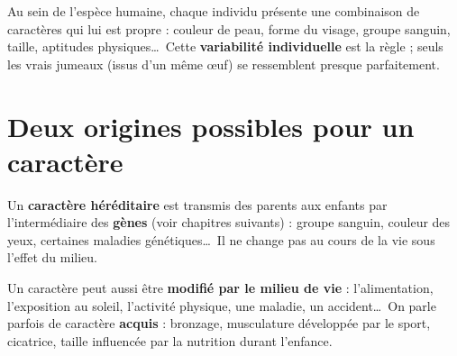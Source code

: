 \begin{propriete}
Au sein de l'espèce humaine, chaque individu présente une combinaison de caractères qui
lui est propre : couleur de peau, forme du visage, groupe sanguin, taille, aptitudes
physiques\dots\ Cette \textbf{variabilité individuelle} est la règle ; seuls les vrais
jumeaux (issus d'un même \oe uf) se ressemblent presque parfaitement.
\end{propriete}

\begin{illus}
\end{illus}

\section{Deux origines possibles pour un caractère}

\begin{definition}
Un \textbf{caractère héréditaire} est transmis des parents aux enfants par
l'intermédiaire des \textbf{gènes} (voir chapitres suivants) : groupe sanguin, couleur
des yeux, certaines maladies génétiques\dots\ Il ne change pas au cours de la vie sous
l'effet du milieu.
\end{definition}

\begin{definition}
Un caractère peut aussi être \textbf{modifié par le milieu de vie} : l'alimentation,
l'exposition au soleil, l'activité physique, une maladie, un accident\dots\ On parle
parfois de caractère \textbf{acquis} : bronzage, musculature développée par le sport,
cicatrice, taille influencée par la nutrition durant l'enfance.
\end{definition}

